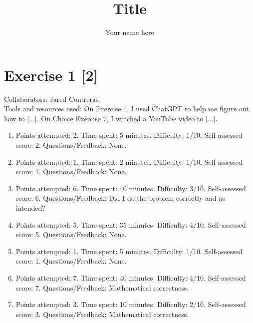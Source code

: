\documentclass{article}
\title{Title}
\author{Your name here}
\begin{document}
\maketitle

\section*{Exercise 1 [2]}

Collaborators: Jared Contreras
\\
Tools and resources used: On Exercise 1, I used ChatGPT to help me figure out how to [...]. On Choice Exercise 7, I watched a YouTube video to [...].
\\
\begin{enumerate}
  \item[Exercise 1]
    {\color{red} Points attempted: 2}.
    {\color{blue} Time spent: 5 minutes}.
    {\color{brown} Difficulty: 1/10}.
    {\color{green!50!black} Self-assessed score: 2}.
    {\color{magenta} Questions/Feedback: None.}
  \item[Exercise 2]
    {\color{red} Points attempted: 1}.
    {\color{blue} Time spent: 2 minutes}.
    {\color{brown} Difficulty: 1/10}.
    {\color{green!50!black} Self-assessed score: 1}.
    {\color{magenta} Questions/Feedback: None.}
  \item[Exercise 3]
    {\color{red} Points attempted: 6}.
    {\color{blue} Time spent: 40 minutes}.
    {\color{brown} Difficulty: 3/10}.
    {\color{green!50!black} Self-assessed score: 6}.
    {\color{magenta} Questions/Feedback: Did I do the problem correctly and as intended?}
  \item[Exercise 4]
    {\color{red} Points attempted: 5}.
    {\color{blue} Time spent: 35 minutes}.
    {\color{brown} Difficulty: 4/10}.
    {\color{green!50!black} Self-assessed score: 5}.
    {\color{magenta} Questions/Feedback: None.}
  \item[Exercise 5]
    {\color{red} Points attempted: 1}.
    {\color{blue} Time spent: 5 minutes}.
    {\color{brown} Difficulty: 1/10}.
    {\color{green!50!black} Self-assessed score: 1}.
    {\color{magenta} Questions/Feedback: None.}
  \item[Exercise 8]
    {\color{red} Points attempted: 7}.
    {\color{blue} Time spent: 40 minutes}.
    {\color{brown} Difficulty: 4/10}.
    {\color{green!50!black} Self-assessed score: 7}.
    {\color{magenta} Questions/Feedback: Mathematical correctness.}
  \item[Exercise 10]
    {\color{red} Points attempted: 3}.
    {\color{blue} Time spent: 10 minutes}.
    {\color{brown} Difficulty: 2/10}.
    {\color{green!50!black} Self-assessed score: 3}.
    {\color{magenta} Questions/Feedback: Mathematical correctness.}
\end{enumerate}
\pagebreak
\end{document}
